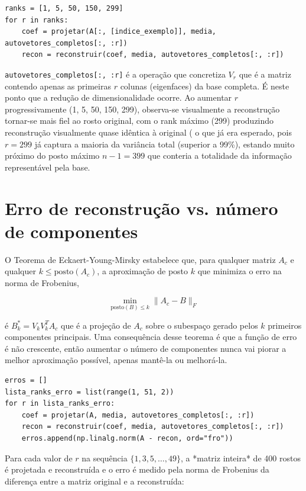 \documentclass[12pt,a4paper]{article}
\begin{document}
\begin{lstlisting}
ranks = [1, 5, 50, 150, 299]
for r in ranks:
    coef = projetar(A[:, [indice_exemplo]], media, autovetores_completos[:, :r])
    recon = reconstruir(coef, media, autovetores_completos[:, :r])
\end{lstlisting}

\texttt{autovetores\_completos[:, :r]} é a operação que concretiza $V_r$ que é a
matriz contendo apenas as primeiras $r$ colunas (eigenfaces) da base completa. É
neste ponto que a redução de dimensionalidade ocorre. Ao aumentar $r$ progressivamente (1, 5, 50, 150, 299), observa-se
visualmente a reconstrução tornar-se mais fiel ao rosto original, com
o rank máximo (299) produzindo reconstrução visualmente quase idêntica à
original ( o que já era esperado, pois $r=299$ já captura a maioria da
variância total (superior a 99\%), estando muito próximo do posto
máximo $n-1=399$ que conteria a totalidade da informação representável pela base.

\section{Erro de reconstrução vs. número de componentes}

O Teorema de Eckaert-Young-Mirsky estabelece que, para qualquer
matriz $A_c$ e qualquer $k \leq \text{posto}(A_c)$, a aproximação de posto $k$ que
minimiza o erro na norma de Frobenius,

$$\min_{\text{posto}(B)\leq k} \|A_c - B\|_F$$

é $B_k^* = V_kV_k^TA_c$ que é a projeção de $A_c$ sobre o subespaço gerado
pelos $k$ primeiros componentes principais. Uma consequência desse teorema é
que a função de erro é não crescente, então aumentar o número de componentes nunca vai piorar a
melhor aproximação possível, apenas mantê-la ou melhorá-la.

\begin{lstlisting}
erros = []
lista_ranks_erro = list(range(1, 51, 2))
for r in lista_ranks_erro:
    coef = projetar(A, media, autovetores_completos[:, :r])
    recon = reconstruir(coef, media, autovetores_completos[:, :r])
    erros.append(np.linalg.norm(A - recon, ord="fro"))
\end{lstlisting}

Para cada valor de $r$ na sequência $\{1,3,5,\dots,49\}$, a *matriz
inteira* de 400 rostos é projetada e reconstruída e o erro é medido pela norma de Frobenius da diferença entre a matriz
original e a reconstruída:
\end{document}
